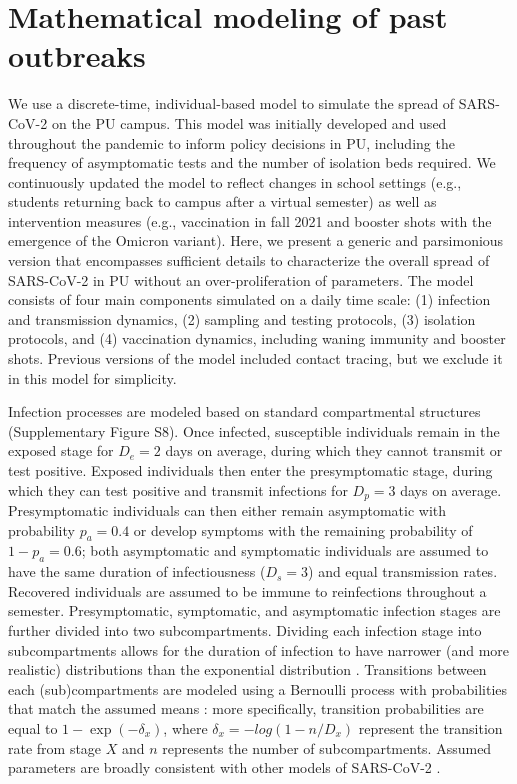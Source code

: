 \documentclass[12pt]{article}
\begin{document}
\section*{Mathematical modeling of past outbreaks}

We use a discrete-time, individual-based model to simulate the spread of SARS-CoV-2 on the PU campus.
This model was initially developed and used throughout the pandemic to inform policy decisions in PU, including the frequency of asymptomatic tests and the number of isolation beds required.
We continuously updated the model to reflect changes in school settings (e.g., students returning back to campus after a virtual semester) as well as intervention measures (e.g., vaccination in fall 2021 and booster shots with the emergence of the Omicron variant).
Here, we present a generic and parsimonious version that encompasses sufficient details to characterize the overall spread of SARS-CoV-2 in PU without an over-proliferation of parameters.
The model consists of four main components simulated on a daily time scale: (1) infection and transmission dynamics, (2) sampling and testing protocols, (3) isolation protocols, and (4) vaccination dynamics, including waning immunity and booster shots.
Previous versions of the model included contact tracing, but we exclude it in this model for simplicity.

Infection processes are modeled based on standard compartmental structures (Supplementary Figure S8).
Once infected, susceptible individuals remain in the exposed stage for $D_e = 2$ days on average, during which they cannot transmit or test positive. 
Exposed individuals then enter the presymptomatic stage, during which they can test positive and transmit infections for $D_p = 3$ days on average.
Presymptomatic individuals can then either remain asymptomatic with probability $p_a = 0.4$ or develop symptoms with the remaining probability of $1-p_a = 0.6$; both asymptomatic and symptomatic individuals are assumed to have the same duration of infectiousness ($D_s=3$) and equal transmission rates.
Recovered individuals are assumed to be immune to reinfections throughout a semester.
Presymptomatic, symptomatic, and asymptomatic infection stages are further divided into two subcompartments.
Dividing each infection stage into subcompartments allows for the duration of infection to have narrower (and more realistic) distributions than the exponential distribution \citep{brett2020transmission}.
Transitions between each (sub)compartments are modeled using a Bernoulli process with probabilities that match the assumed means \citep{he2010plug}:
more specifically, transition probabilities are equal to $1 - \exp(-\delta_x)$, where $\delta_x = -log(1-n/D_x)$ represent the transition rate from stage $X$ and $n$ represents the number of subcompartments.
Assumed parameters are broadly consistent with other models of SARS-CoV-2 \citep{brett2020transmission,lavezzo2020suppression}.
\end{document}
